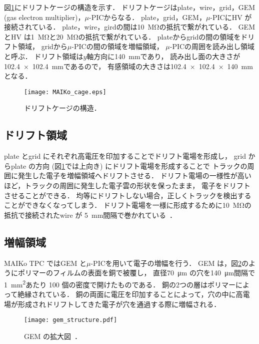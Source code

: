 \documentclass[../master]{subfiles}
\begin{document}
図\ref{fig::MAIKo_cage}にドリフトケージの構造を示す．
ドリフトケージはplate，wire，grid，GEM (gas electron multiplier)，$\mu$-PICからなる．
plate，grid，GEM，$\mu$-PICにHV が接続されている．
plate，wire，girdの間は\SI{10}{\mega\ohm}の抵抗で繋がれている．
GEM とHV は\SI{1}{\mega\ohm}と\SI{20}{\mega\ohm}の抵抗で繋がれている．
plateからgridの間の領域をドリフト領域，
gridから$\mu$-PICの間の領域を増幅領域，
$\mu$-PICの周囲を読み出し領域と呼ぶ．
ドリフト領域は$y$軸方向に\SI{140}{\milli\metre}であり，
読み出し面の大きさが\SI{102.4x102.4}{\milli\metre}であるので，
有感領域の大きさは\SI{102.4x102.4x140}{\milli\metre}となる．
\begin{figure}
  \centering
  \texttt{[image: MAIKo\_cage.eps]}
  \caption{ドリフトケージの構造．}
  \label{fig::MAIKo_cage}
\end{figure}


\subsection{ドリフト領域}
plate とgrid にそれぞれ高電圧を印加することでドリフト電場を形成し，
grid からplate の方向 (図\ref{fig::MAIKo_cage}では上向き) にドリフト電場を形成することで
トラックの周囲に発生した電子を増幅領域へドリフトさせる．
ドリフト電場の一様性が高いほど，トラックの周囲に発生した電子雲の形状を保ったまま，
電子をドリフトさせることができる．
均等にドリフトしない場合，正しくトラックを検出することができなくなってしまう．
ドリフト電場を一様に形成するために\SI{10}{\mega\ohm}の抵抗で接続されたwire が
\SI{5}{\milli\metre}間隔で巻かれている~\cite{furuno}．

\subsection{増幅領域}
MAIKo TPC ではGEM と$\mu$-PICを用いて電子の増幅を行う．
GEM は，図\ref{pic::GEM}のようにポリマーのフィルムの表面を銅で被覆し，
直径\SI{70}{\micro\metre} の穴を\SI{140}{\micro\metre}間隔で\SI{1}{\square\milli\metre}あたり
100 個の密度で開けたものである．
銅の2つの層はポリマーによって絶縁されている．
銅の両面に電圧を印加することによって，穴の中に高電場が形成されドリフトしてきた電子が穴を通過する際に増幅される．
\begin{figure}
  \centering
  \texttt{[image: gem\_structure.pdf]}
  \caption{GEM の拡大図~\cite{gem_compass}．}
  \label{pic::GEM}  
\end{figure}
\end{document}
